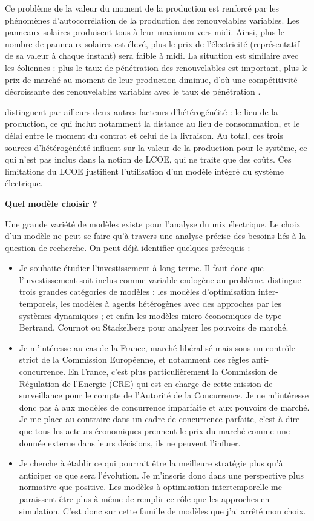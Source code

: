 Ce problème de la valeur du moment de la production est renforcé par les phénomènes d’autocorrélation de la production des renouvelables variables. Les panneaux solaires produisent tous à leur maximum vers midi. Ainsi, plus le nombre de panneaux solaires est élevé, plus le prix de l’électricité (représentatif de sa valeur à chaque instant) sera faible à midi. La situation est similaire avec les éoliennes : plus le taux de pénétration des renouvelables est important, plus le prix de marché au moment de leur production diminue, d’où une compétitivité décroissante des renouvelables variables avec le taux de pénétration \citep{Hirth2013}.

\citet{Hirth2016} distinguent par ailleurs deux autres facteurs d’hétérogénéité : le lieu de la production, ce qui inclut notamment la distance au lieu de consommation, et le délai entre le moment du contrat et celui de la livraison. Au total, ces trois sources d’hétérogénéité influent sur la valeur de la production pour le système, ce qui n’est pas inclus dans la notion de LCOE, qui ne traite que des coûts. 
Ces limitations du LCOE justifient l’utilisation d’un modèle intégré du système électrique.

\vspace{1em}
\textbf{Quel modèle choisir ?}

Une grande variété de modèles existe pour l’analyse du mix électrique. Le choix d’un modèle ne peut se faire qu’à travers une analyse précise des besoins liés à la question de recherche.
On peut déjà identifier quelques prérequis :
\begin{itemize}
	\item Je souhaite étudier l’investissement à long terme. Il faut donc que l’investissement soit inclus comme variable endogène au problème. \citet{Petitet2016} distingue trois grandes catégories de modèles : les modèles d’optimisation inter-temporels, les modèles à agents hétérogènes avec des approches par les systèmes dynamiques ; et enfin les modèles micro-économiques de type Bertrand, Cournot ou Stackelberg pour analyser les pouvoirs de marché. 
	\item Je m’intéresse au cas de la France, marché libéralisé mais sous un contrôle strict de la Commission Européenne, et notamment des règles anti-concurrence. En France, c’est plus particulièrement la Commission de Régulation de l’Energie (CRE) qui est en charge de cette mission de surveillance pour le compte de l'Autorité de la Concurrence. Je ne m’intéresse donc pas à aux modèles de concurrence imparfaite et aux pouvoirs de marché. Je me place au contraire dans un cadre de concurrence parfaite, c’est-à-dire que tous les acteurs économiques prennent le prix du marché comme une donnée externe dans leurs décisions, ils ne peuvent l’influer. 
	\item Je cherche à établir ce qui pourrait être la meilleure stratégie plus qu’à anticiper ce que sera l’évolution. Je m’inscris donc dans une perspective plus normative que positive. Les modèles à optimisation intertemporelle me paraissent être plus à même de remplir ce rôle que les approches en simulation. C’est donc sur cette famille de modèles que j’ai arrêté mon choix.
\end{itemize}

